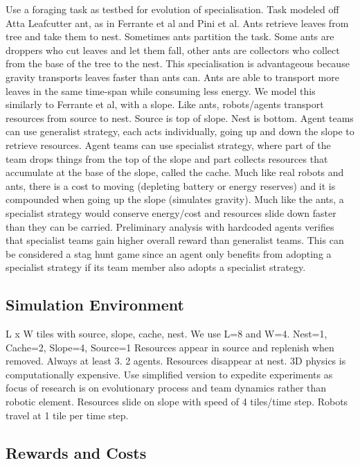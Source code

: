 \documentclass[sigconf]{aamas}  %
\begin{document}
Use a foraging task as testbed for evolution of specialisation.
Task modeled off Atta Leafcutter ant, as in Ferrante et al and Pini et al.
Ants retrieve leaves from tree and take them to nest. 
Sometimes ants partition the task. Some ants are droppers who cut leaves and let them fall, other ants are collectors who collect from the base of the tree to the nest.
This specialisation is advantageous because gravity transports leaves faster than ants can.
Ants are able to transport more leaves in the same time-span while consuming less energy.
We model this similarly to Ferrante et al, with a slope.
Like ants, robots/agents transport resources from source to nest. Source is top of slope. Nest is bottom.
Agent teams can use generalist strategy, each acts individually, going up and down the slope to retrieve resources.
Agent teams can use specialist strategy, where part of the team drops things from the top of the slope and part collects resources that accumulate at the base of the slope, called the cache.
Much like real robots and ants, there is a cost to moving (depleting battery or energy reserves) and it is compounded when going up the slope (simulates gravity). 
Much like the ants, a specialist strategy would conserve energy/cost and resources slide down faster than they can be carried. Preliminary analysis with hardcoded agents verifies that specialist teams gain higher overall reward than generalist teams.
This can be considered a stag hunt game since an agent only benefits from adopting a specialist strategy if its team member also adopts a specialist strategy. 

\subsection{Simulation Environment}

L x W tiles with source, slope, cache, nest.
We use L=8 and W=4.
Nest=1, Cache=2, Slope=4, Source=1
Resources appear in source and replenish when removed. Always at least 3. 2 agents.
Resources disappear at nest.
3D physics is computationally expensive. Use simplified version to expedite experiments as focus of research is on evolutionary process and team dynamics rather than robotic element.
Resources slide on slope with speed of 4 tiles/time step.
Robots travel at 1 tile per time step.


\subsection{Rewards and Costs}
\end{document}
